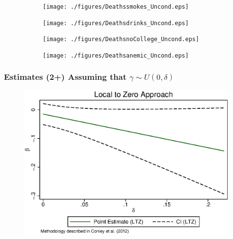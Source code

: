 \documentclass[9pt,letterpaper,subeqn]{beamer}
\begin{document}

\begin{frame}[label=fdgraph]
  \begin{figure}[htpb!]
    \caption{Rates of Miscarriage are higher for twins with unhealthy mothers}
      \begin{subfigure}{.5\textwidth}
      \texttt{[image: ./figures/Deathssmokes\_Uncond.eps]}
    \end{subfigure}%
    \begin{subfigure}{.5\textwidth}
      \texttt{[image: ./figures/Deathsdrinks\_Uncond.eps]}
    \end{subfigure}
    \begin{subfigure}{.5\textwidth}
      \texttt{[image: ./figures/DeathsnoCollege\_Uncond.eps]}
    \end{subfigure}%
    \begin{subfigure}{.5\textwidth}
      \texttt{[image: ./figures/Deathsanemic\_Uncond.eps]}
    \end{subfigure}
    \label{fig:mech}
  \end{figure}
\hyperlink{mech}{}
\end{frame}


\begin{frame}[label=Conley2]
\frametitle{Estimates (2+) Assuming that $\gamma \sim U(0,\delta)$}
\begin{figure}[htpb!]
\centering
  \includegraphics[scale=0.75]{./figures/LTZ_two.eps}
\end{figure}
\hyperlink{Conley3}{}
\end{frame}
\end{document}
